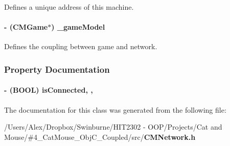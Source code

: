 Defines a unique address of this machine. 

\paragraph[{\-\_\-game\-Model}]{\setlength{\rightskip}{0pt plus 5cm}-\/ ({\bf C\-M\-Game}$\ast$) \-\_\-game\-Model\hspace{0.3cm}{\ttfamily [protected]}}\label{interface_c_m_network_acfb119fbb30d35949176b2c1d2e7bd35}


Defines the coupling between game and network. 



\subsubsection{Property Documentation}
\paragraph[{is\-Connected}]{\setlength{\rightskip}{0pt plus 5cm}-\/ (B\-O\-O\-L) is\-Connected\hspace{0.3cm}{\ttfamily [read]}, {\ttfamily [atomic]}, {\ttfamily [assign]}}\label{interface_c_m_network_a70dba80bb8b16b179d3a79fcc4d62786}


The documentation for this class was generated from the following file\-:\begin{DoxyCompactItemize}
\item 
/\-Users/\-Alex/\-Dropbox/\-Swinburne/\-H\-I\-T2302 -\/ O\-O\-P/\-Projects/\-Cat and Mouse/\#4\-\_\-\-Cat\-Mouse\-\_\-\-Obj\-C\-\_\-\-Coupled/src/{\bf C\-M\-Network.\-h}\end{DoxyCompactItemize}
